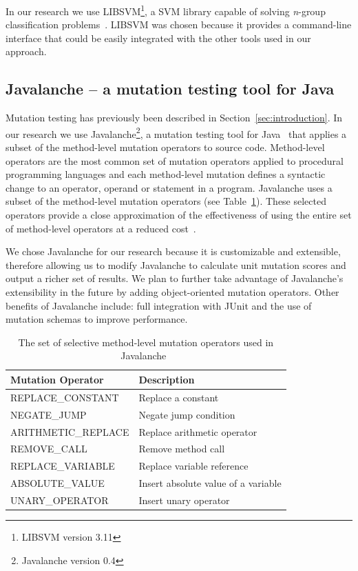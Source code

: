 \documentclass[conference]{IEEEtran}
\begin{document}
In our research we use LIBSVM\footnote{LIBSVM version 3.11}, a SVM library capable of solving \emph{n}-group classification problems~\cite{CL11}. LIBSVM was chosen because it provides a command-line interface that could be easily integrated with the other tools used in our approach.


\subsection{Javalanche -- a mutation testing tool for Java}
\label{subsec:javalanche}
Mutation testing has previously been described in Section~\ref{sec:introduction}. In our research we use Javalanche\footnote{Javalanche version 0.4}, a mutation testing tool for Java~\cite{SZ09} that applies a subset of the method-level mutation operators to source code. Method-level operators are the most common set of mutation operators applied to procedural programming languages and each method-level mutation defines a syntactic change to an operator, operand or statement in a program. Javalanche uses a subset of the method-level mutation operators (see Table~\ref{tab:mutation_operators}). These selected operators provide a close approximation of the effectiveness of using the entire set of method-level operators at a reduced cost~\cite{OLR+96}. 

We chose Javalanche for our research because it is customizable and extensible, therefore allowing us to modify Javalanche to calculate unit mutation scores and output a richer set of results. We plan to further take advantage of Javalanche's extensibility in the future by adding object-oriented mutation operators. Other benefits of Javalanche include: full integration with JUnit and the use of mutation schemas to improve performance. 

\begin{table}[!t]
  \centering
  \begin{tabular}{|l|l|}
    \hline
    \rowcolor[RGB]{169,196,223}
    \textbf{Mutation Operator} & \textbf{Description} \\
    \hline REPLACE\_CONSTANT & Replace a constant \\
    \hline NEGATE\_JUMP & Negate jump condition \\
    \hline ARITHMETIC\_REPLACE & Replace arithmetic operator \\
    \hline REMOVE\_CALL & Remove method call \\
    \hline REPLACE\_VARIABLE & Replace variable reference\\
    \hline ABSOLUTE\_VALUE & Insert absolute value of a variable \\
    \hline UNARY\_OPERATOR & Insert unary operator \\
    \hline
  \end{tabular}
  \caption{The set of selective method-level mutation operators used in Javalanche~\cite{OLR+96}}
  \label{tab:mutation_operators}
\end{table}
\end{document}
